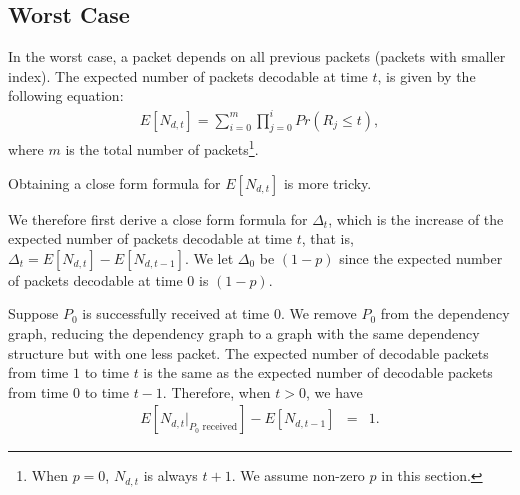 \subsection{Worst Case}

    

    In the worst case, a packet depends on all previous packets (packets
    with smaller index).  The expected number of packets decodable at
    time $t$, is given by the following equation:
    \begin{eqnarray}
    \label{e:model:endt}
    E[N_{d,t}] = \sum_{i=0}^{m} \prod_{j=0}^i Pr(R_j \le t),
    \end{eqnarray}
    where $m$ is the total number of packets\footnote{When $p=0$, $N_{d,t}$ is always $t+1$.  We assume non-zero $p$ in this section.}.

    Obtaining a close form formula for $E[N_{d,t}]$ is more tricky.
    
    We therefore first derive a close form formula for $\Delta_t$, which is 
    the increase of the expected number of packets decodable at time $t$,
    that is, $\Delta_t = E[N_{d,t}] - E[N_{d,t-1}]$. 
    We let $\Delta_0$ be $(1-p)$ since
    the expected number of packets decodable at time 0 is $(1-p)$.

    Suppose $P_0$ is successfully received at time $0$.  We remove $P_0$
    from the dependency graph, reducing the dependency graph to a 
    graph with the same dependency structure
    but with one less packet.  The expected number of decodable
    packets from time $1$ to time $t$ is the same as the expected
    number of decodable packets from time $0$ to time $t-1$.  Therefore,
    when $t>0$, we have
    \begin{eqnarray}
    \label{e:model:p0received}
    E[N_{d,t}|_{\textrm{$P_0$ received}}] - E[N_{d,t-1}] &=& 1.%
    \end{eqnarray}

